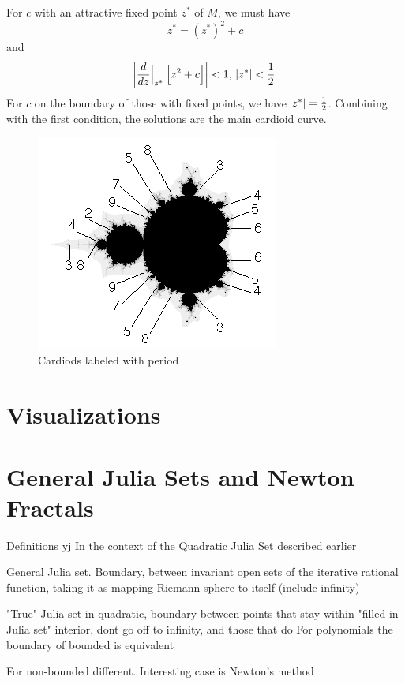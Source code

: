 \documentclass{article}
\begin{document}
For $c$ with an attractive fixed point $z^*$ of $M$, we must have
\[ z^* = (z^*)^2 + c \]
and
\[ \abs{\frac{d}{dz}\Bigr|_{z^*}\left[z^2 + c\right]} < 1,\ \abs{z^*} < \frac{1}{2} \]
For $c$ on the boundary of those with fixed points, we have $\abs{z^*} = \frac{1}{2}$. Combining with the first condition, the solutions are the main cardioid curve.



\begin{figure}[!htbp]
    \centering
    \includegraphics[width=.4\linewidth]{MandelMap1.png}
    \caption{Cardiods labeled with period \cite{MichaelFrame}} %
    \label{fig:MandelbrotCycles}
\end{figure}


\section{Visualizations}



\section{General Julia Sets and Newton Fractals}

Definitions
yj
In the context of the Quadratic Julia Set described earlier


General Julia set. Boundary, between invariant open sets of the iterative rational function, taking it as mapping Riemann sphere to itself (include infinity)

"True" Julia set in quadratic, boundary between points that stay within "filled in Julia set" interior, dont go off to infinity, and those that do
    For polynomials the boundary of bounded is equivalent

For non-bounded different. Interesting case is Newton's method





%
\end{document}
